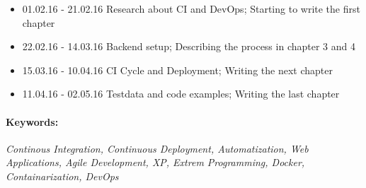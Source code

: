 \begin{itemize}
  \item 01.02.16 - 21.02.16 Research about CI and DevOps; Starting to write the first chapter
  \item 22.02.16 - 14.03.16 Backend setup; Describing the process in chapter 3 and 4
  \item 15.03.16 - 10.04.16 CI Cycle and Deployment; Writing the next chapter
  \item 11.04.16 - 02.05.16 Testdata and code examples; Writing the last chapter
\end{itemize}

\paragraph{Keywords:}
\textit{Continous Integration, Continuous Deployment, Automatization, Web Applications, Agile Development, XP, Extrem Programming, Docker, Containarization, DevOps }
